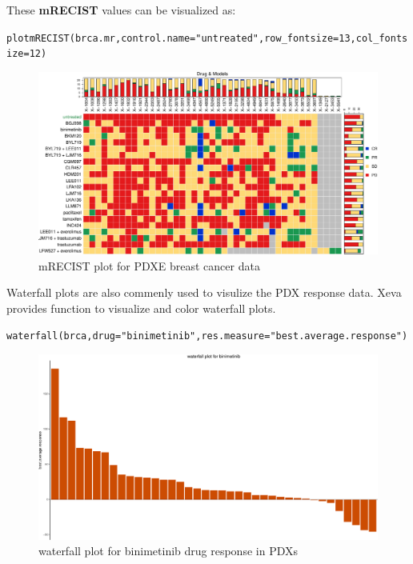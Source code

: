 \documentclass{article}\usepackage[]{graphicx}\usepackage[usenames,dvipsnames]{color}
\makeatletter
\def\maxwidth{ %
  \ifdim\Gin@nat@width>\linewidth
    \linewidth
  \else
    \Gin@nat@width
  \fi
}
\newcommand{\hlnum}[1]{\textcolor[rgb]{0.816,0.125,0.439}{#1}}%
\newcommand{\hlstr}[1]{\textcolor[rgb]{0.251,0.627,0.251}{#1}}%
\newcommand{\hlstd}[1]{\textcolor[rgb]{0.251,0.251,0.251}{#1}}%
\newcommand{\hlkwc}[1]{\textcolor[rgb]{0.251,0.251,0.251}{#1}}%
\newcommand{\hlkwd}[1]{\textcolor[rgb]{0.878,0.439,0.125}{#1}}%
\newenvironment{knitrout}{}{} %
\makeatother
\begin{document}
These \textbf{mRECIST}  values can be visualized as:
\begin{knitrout}
\color{fgcolor}\begin{kframe}
\begin{alltt}
\hlkwd{plotmRECIST}\hlstd{(brca.mr,} \hlkwc{control.name}\hlstd{=}\hlstr{"untreated"}\hlstd{,} \hlkwc{row_fontsize}\hlstd{=}\hlnum{13}\hlstd{,} \hlkwc{col_fontsize}\hlstd{=}\hlnum{12}\hlstd{)}
\end{alltt}
\end{kframe}\begin{figure}
\includegraphics[width=\maxwidth]{figure/mR_BRCA-1} \caption{mRECIST plot for PDXE breast cancer data}\label{fig:mR_BRCA}
\end{figure}

\end{knitrout}


Waterfall plots are also commenly used to visulize the PDX response data.
Xeva provides function to visualize and color waterfall plots.
\begin{knitrout}
\color{fgcolor}\begin{kframe}
\begin{alltt}
\hlkwd{waterfall}\hlstd{(brca,} \hlkwc{drug}\hlstd{=}\hlstr{"binimetinib"}\hlstd{,} \hlkwc{res.measure}\hlstd{=}\hlstr{"best.average.response"}\hlstd{)}
\end{alltt}
\end{kframe}\begin{figure}
\includegraphics[width=\maxwidth]{figure/waterFall1-1} \caption{waterfall plot for binimetinib drug response in PDXs}\label{fig:waterFall1}
\end{figure}

\end{knitrout}
\end{document}
